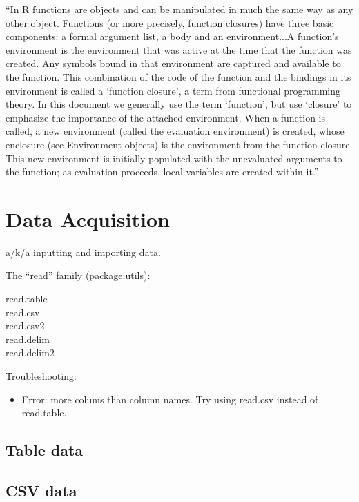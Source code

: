  ``In R functions are objects and can be manipulated in much the same way as any other object. Functions (or more precisely, function closures) have three basic components: a formal argument list, a body and an environment...A function’s environment is the environment that was active at the time that the function was created. Any symbols bound in that environment are captured and available to the function. This combination of the code of the function and the bindings in its environment is called a ‘function closure’, a term from functional programming theory. In this document we generally use the term ‘function’, but use ‘closure’ to emphasize the importance of the attached environment.  When a function is called, a new environment (called the evaluation environment) is created, whose enclosure (see Environment objects) is the environment from the function closure. This new environment is initially populated with the unevaluated arguments to the function; as evaluation proceeds, local variables are created within it.''

\section{Data Acquisition}

a/k/a inputting and importing data.

The ``read'' family (package:utils):

\begin{description}
  \item [read.table]
  \item [read.csv]
  \item [read.csv2]
  \item [read.delim]
  \item [read.delim2]
\end{description}

Troubleshooting:
\begin{itemize}
\item Error: more colums than column names.  Try using read.csv instead of read.table.
\end{itemize}

\subsection{Table data}
\subsection{CSV data}
